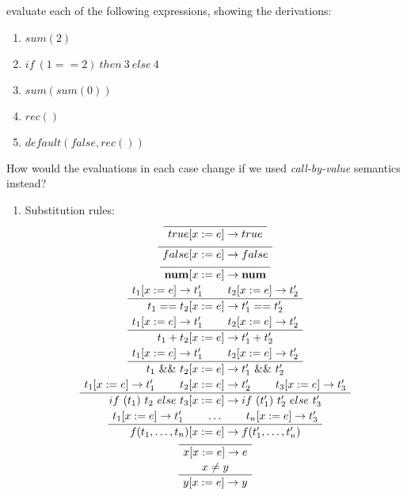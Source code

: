 \begin{exercise}{}
\begin{enumerate}
      evaluate each of the following expressions, showing the derivations:
      \begin{enumerate}
        \item \(sum(2)\)
        \item \(if ~(1 == 2) ~ then ~ 3 ~ else ~ 4\)
        \item \(sum(sum(0))\)
        \item \(rec()\)
        \item \(default(false, rec())\)
      \end{enumerate}

      How would the evaluations in each case change if we used \emph{call-by-value}
      semantics instead?
  \end{enumerate}

  \begin{solution}
    \allowdisplaybreaks

    \begin{enumerate}
      \item Substitution rules:
      \begin{gather*}
        \AxiomC{}
        \UnaryInfC{\(true[x := e] \to true\)}
        \DisplayProof \\
        \AxiomC{}
        \UnaryInfC{\(false[x := e] \to false\)}
        \DisplayProof \\
        \AxiomC{}
        \UnaryInfC{\(\num[x := e] \to \num\)}
        \DisplayProof \\
        \AxiomC{\(t_1[x := e] \to t_1'\)}
        \AxiomC{\(t_2[x := e] \to t_2'\)}
        \BinaryInfC{\(t_1 == t_2[x := e] \to t_1' == t_2'\)}
        \DisplayProof \\
        \AxiomC{\(t_1[x := e] \to t_1'\)}
        \AxiomC{\(t_2[x := e] \to t_2'\)}
        \BinaryInfC{\(t_1 + t_2[x := e] \to t_1' + t_2'\)}
        \DisplayProof \\
        \AxiomC{\(t_1[x := e] \to t_1'\)}
        \AxiomC{\(t_2[x := e] \to t_2'\)}
        \BinaryInfC{\(t_1 ~\&\& ~t_2[x := e] \to t_1' ~\&\& ~t_2'\)}
        \DisplayProof \\
        \AxiomC{\(t_1[x := e] \to t_1'\)}
        \AxiomC{\(t_2[x := e] \to t_2'\)}
        \AxiomC{\(t_3[x := e] \to t_3'\)}
        \TrinaryInfC{\(if ~(t_1) ~t_2 ~else ~t_3[x := e] \to if ~(t_1') ~t_2' ~else ~t_3'\)}
        \DisplayProof \\
        \AxiomC{\(t_1[x := e] \to t_1'\)}
        \AxiomC{\(\ldots\)}
        \AxiomC{\(t_n[x := e] \to t_3'\)}
        \TrinaryInfC{\(f(t_1, \ldots, t_n)[x := e] \to f(t_1', \ldots, t_n')\)}
        \DisplayProof \\
        \AxiomC{}
        \UnaryInfC{\(x[x := e] \to e\)}
        \DisplayProof \\
        \AxiomC{\(x \neq y\)}
        \UnaryInfC{\(y[x := e] \to y\)}
        \DisplayProof
      \end{gather*}


\end{enumerate}
\end{solution}
\end{exercise}
